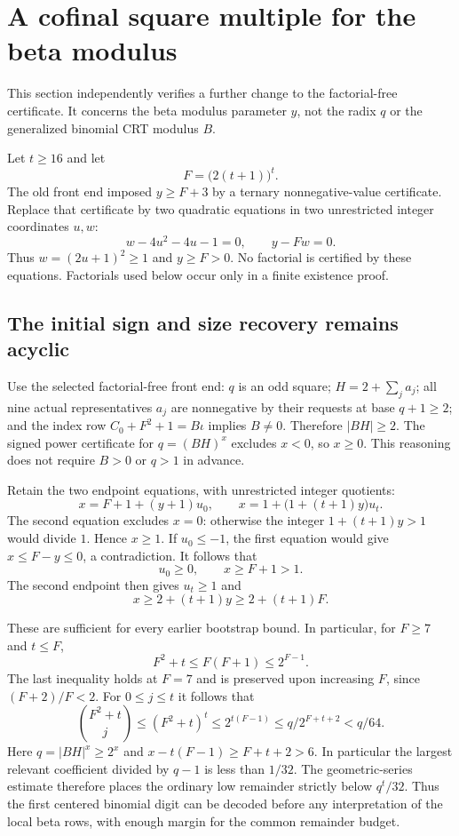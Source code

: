 \section{A cofinal square multiple for the beta modulus}
\label{sec:odd-square-beta}

This section independently verifies a further change to the factorial-free
certificate.  It concerns the beta modulus parameter $y$, not the radix $q$
or the generalized binomial CRT modulus $B$.

Let $t\ge16$ and let
\[
 F=\bigl(2(t+1)\bigr)^t.
\]
The old front end imposed $y\ge F+3$ by a ternary nonnegative-value
certificate.  Replace that certificate by two quadratic equations in two
unrestricted integer coordinates $u,w$:
\begin{equation}\label{eq:odd-square-beta-rows}
 w-4u^2-4u-1=0,\qquad y-Fw=0.
\end{equation}
Thus $w=(2u+1)^2\ge1$ and $y\ge F>0$.  No factorial is certified by
these equations.  Factorials used below occur only in a finite existence
proof.

\subsection{The initial sign and size recovery remains acyclic}

Use the selected factorial-free front end: $q$ is an odd square;
$H=2+\sum_j a_j$; all nine actual representatives $a_j$ are
nonnegative by their requests at base $q+1\ge2$; and the index row
$C_0+F^2+1=B\iota$ implies $B\ne0$.  Therefore $|BH|\ge2$.
The signed power certificate for $q=(BH)^x$ excludes $x<0$, so $x\ge0$.
This reasoning does not require $B>0$ or $q>1$ in advance.

Retain the two endpoint equations, with unrestricted integer quotients:
\begin{equation}\label{eq:odd-square-beta-endpoints}
 x=F+1+(y+1)u_0,\qquad
 x=1+\bigl(1+(t+1)y\bigr)u_t.
\end{equation}
The second equation excludes $x=0$: otherwise the integer
$1+(t+1)y>1$ would divide $1$.  Hence $x\ge1$.
If $u_0\le-1$, the first equation would give
$x\le F-y\le0$, a contradiction.  It follows that
\[
 u_0\ge0,\qquad x\ge F+1>1.
\]
The second endpoint then gives $u_t\ge1$ and
\begin{equation}\label{eq:odd-square-beta-x-bound}
 x\ge2+(t+1)y\ge2+(t+1)F.
\end{equation}

These are sufficient for every earlier bootstrap bound.  In particular,
for $F\ge7$ and $t\le F$,
\[
 F^2+t\le F(F+1)\le2^{F-1}.
\]
The last inequality holds at $F=7$ and is preserved upon increasing $F$,
since $(F+2)/F<2$.  For $0\le j\le t$ it follows that
\[
 \binom{F^2+t}{j}\le(F^2+t)^t\le2^{t(F-1)}
 \le q/2^{F+t+2}<q/64.
\]
Here $q=|BH|^x\ge2^x$ and
$x-t(F-1)\ge F+t+2>6$.  In particular the largest relevant coefficient
divided by $q-1$ is less than $1/32$.  The geometric-series estimate
therefore places the ordinary low remainder strictly below $q^t/32$.
Thus the first centered binomial digit can be decoded before any
interpretation of the local beta rows, with enough margin for the common
remainder budget.


